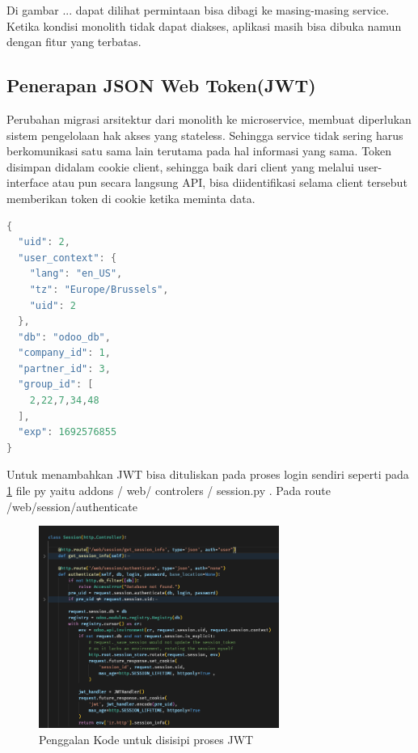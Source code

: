 Di gambar ... dapat dilihat permintaan bisa dibagi ke masing-masing service. 
Ketika kondisi monolith tidak dapat diakses, aplikasi masih bisa dibuka namun dengan fitur yang terbatas.

\subsection{Penerapan JSON Web  Token(JWT)}
Perubahan migrasi arsitektur dari monolith ke microservice, membuat diperlukan sistem pengelolaan hak akses yang stateless. Sehingga service tidak sering harus berkomunikasi satu sama lain terutama pada hal informasi yang sama. Token disimpan didalam cookie client, sehingga baik dari client yang melalui user-interface atau pun secara langsung API, bisa diidentifikasi selama client tersebut memberikan token di cookie ketika meminta data.

\begin{lstlisting}[style=mystyle, language=java, caption={Isi data berupa JSON di JWT}]
{
  "uid": 2,
  "user_context": {
    "lang": "en_US",
    "tz": "Europe/Brussels",
    "uid": 2
  },
  "db": "odoo_db",
  "company_id": 1,
  "partner_id": 3,
  "group_id": [
    2,22,7,34,48
  ],
  "exp": 1692576855
}
\end{lstlisting} 


Untuk menambahkan JWT bisa dituliskan pada proses login sendiri seperti pada \ref{fig:sessionRoute} file py yaitu addons / web/ controlers / session.py . Pada route  /web/session/authenticate 
\begin{figure}[htbp]
	\centering
	\includegraphics[width=0.7\textwidth]{img/bab_4/sessionRoute.png}
	\caption{Penggalan Kode untuk disisipi proses JWT}
	\label{fig:sessionRoute}
\end{figure}


